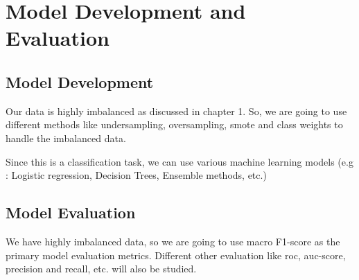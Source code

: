 \chapter{Model Development and Evaluation}

\section{Model Development}
Our data is highly imbalanced as discussed in chapter 1. So, we are going to use different methods like undersampling, oversampling, smote and class weights to handle the imbalanced data.

Since this is a classification task, we can use various machine learning models (e.g : Logistic regression, Decision Trees, Ensemble methods, etc.)

\section{Model Evaluation}
We have highly imbalanced data, so we are going to use macro F1-score as the primary model evaluation metrics. Different other evaluation like roc, auc-score, precision and recall, etc. will also be studied.

